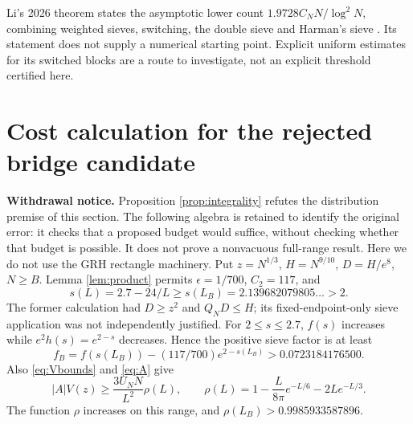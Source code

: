 \documentclass[11pt]{article}
\begin{document}
Li's 2026 theorem states the asymptotic lower count
$1.9728C_NN/\log^2N$, combining weighted sieves, switching, the
double sieve and Harman's sieve \cite{Li2026}.
Its statement does not supply a numerical starting point.
Explicit uniform estimates for its switched blocks are a route
to investigate, not an explicit threshold certified here.

\section{Cost calculation for the rejected bridge candidate}
\textbf{Withdrawal notice.} Proposition \ref{prop:integrality} refutes
the distribution premise of this section. The following algebra is
retained to identify the original error: it checks that a proposed
budget would suffice, without checking whether that budget is possible.
It does not prove a nonvacuous full-range result.
Here we do not use the GRH rectangle machinery. Put $z=N^{1/3}$,
$H=N^{9/10}$, $D=H/e^8$, $N\ge B$. Lemma \ref{lem:product}
permits $\epsilon=1/700$, $C_2=117$, and
\[
s(L)=2.7-24/L\ge s(L_B)=2.139682079805\ldots>2.
\]
The former calculation had $D\ge z^2$ and $Q_ND\le H$; its
fixed-endpoint-only sieve application was not independently justified.
For $2\le s\le2.7$, $f(s)$ increases while $e^2h(s)=e^{2-s}$
decreases. Hence the positive sieve factor is at least
\[
f_B=f(s(L_B))-(117/700)e^{2-s(L_B)}
>0.0723184176500.
\]
Also \eqref{eq:Vbounds} and \eqref{eq:A} give
\[
|A|V(z)\ge\frac{3U_NN}{L^2}\rho(L),\qquad
\rho(L)=1-\frac{L}{8\pi}e^{-L/6}-2Le^{-L/3}.
\]
The function $\rho$ increases on this range, and
$\rho(L_B)>0.9985933587896$.
\end{document}
